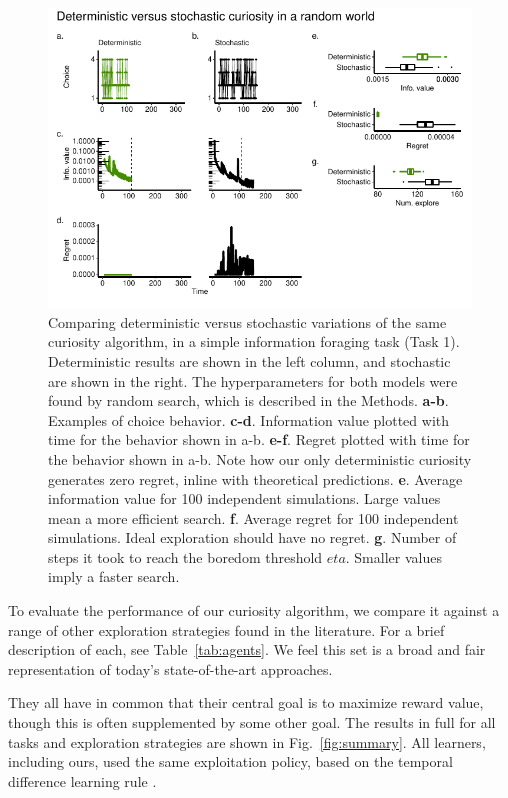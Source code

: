 \begin{figure}
	\begin{fullwidth}
	\includegraphics[width=.7\linewidth]{img/curiosity1.pdf} 
	\caption{Comparing deterministic versus stochastic variations of the same curiosity algorithm, in a simple information foraging task (Task 1). Deterministic results are shown in the left column, and stochastic are shown in the right. The hyperparameters for both models were found by random search, which is described in the Methods.
	\textbf{a-b}. Examples of choice behavior.
	\textbf{c-d}. Information value plotted with time for the behavior shown in a-b.
	\textbf{e-f}. Regret plotted with time for the behavior shown in a-b. Note how our only deterministic curiosity generates zero regret, inline with theoretical predictions.
	\textbf{e}. Average information value for 100 independent simulations. Large values mean a more efficient search.
	\textbf{f}. Average regret for 100 independent simulations. Ideal exploration should have no regret. 
	\textbf{g}. Number of steps it took to reach the boredom threshold $eta$. Smaller values imply a faster search.
	}
	\label{fig:curiosity1} 
	\end{fullwidth}
\end{figure}

To evaluate the performance of our curiosity algorithm, we compare it against a range of other exploration strategies found in the literature. For a brief description of each, see Table~\ref{tab:agents}. We feel this set is a broad and fair representation of today's state-of-the-art approaches.

They all have in common that their central goal is to maximize reward value, though this is often supplemented by some other goal.  The results in full for all tasks and exploration strategies are shown in Fig.~\ref{fig:summary}. All learners, including ours, used the same exploitation policy, based on the temporal difference learning rule \citep{Sutton2018}.

